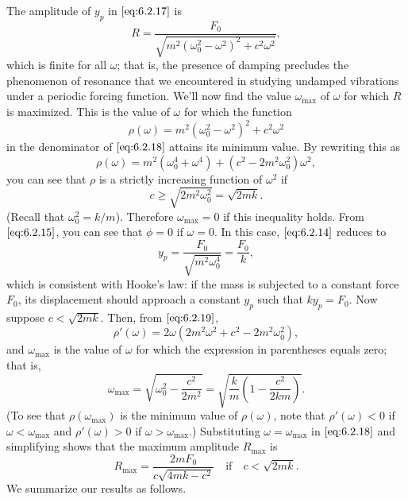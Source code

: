 \documentclass{ximera}
\begin{document}
The amplitude of $y_p$ in $\eqref{eq:6.2.17}$ is
\begin{equation}\label{eq:6.2.18}
R=\frac{F_0}{\sqrt{m^2(\omega^2_0-\omega^2)^2+c^2\omega^2}},
\end{equation}
which is finite for all $\omega$; that is, the presence of damping
precludes the phenomenon of resonance that we encountered in studying
undamped vibrations under a periodic forcing function. We'll now
find the value $\omega_{\max}$ of $\omega$ for which $R$ is maximized.
This is the value of $\omega$ for which the function
$$
\rho (\omega)=m^2(\omega^2_0-\omega^2)^2+c^2\omega^2
$$
in the denominator of  $\eqref{eq:6.2.18}$ attains its minimum value.  By
rewriting this as
\begin{equation}\label{eq:6.2.19}
\rho (\omega)=m^2(\omega^4_0+\omega^4)+
 (c^2-2m^2\omega^2_0)\omega^2,
\end{equation}
 you can see that $\rho$ is a strictly
increasing function of $\omega^2$ if
$$
c\geq\sqrt{2m^2\omega^2_0}=\sqrt{2mk}.
$$
(Recall that $\omega^2_0=k/m$). Therefore $\omega_{\max}=0$ if this
inequality holds. From $\eqref{eq:6.2.15}$, you can see that $\phi=0$ if
$\omega=0$. In this case, $\eqref{eq:6.2.14}$ reduces to
$$
y_p=\frac{F_0}{\sqrt{m^2\omega^4_0}}=\frac{F_0}{k},
$$
which is consistent with Hooke's law: if the mass is subjected to a
constant force $F_0$,  its displacement should approach a constant
$y_p$ such that $ky_p=F_0$. Now suppose   $c<\sqrt{2mk}$. Then,
from $\eqref{eq:6.2.19}$,
$$
\rho'(\omega)=2\omega(2m^2\omega^2+c^2-2m^2\omega^2_0),
$$
and $\omega_{\max}$ is the value of $\omega$ for which the
expression in parentheses equals zero; that is,
$$
\omega_{\max}=\sqrt{\omega^2_0-\frac{c^2}{2m^2}}
=\sqrt{\frac{k}{m}\left(1-\frac{c^2}{2km}\right)}.
$$
(To see that $\rho(\omega_{\max})$ is the minimum value of
$\rho(\omega)$, note that $\rho'(\omega)<0$ if $\omega
<\omega_{\max}$ and $\rho'(\omega)>0$ if $\omega>\omega_{\max}$.)
Substituting $\omega=\omega_{\max}$ in $\eqref{eq:6.2.18}$ and simplifying
shows that the maximum amplitude $R_{\max}$ is
$$
R_{\max}=\frac{2mF_0}{c\sqrt{4mk-c^2}}\quad \mbox{if}\quad c<
\sqrt{2mk}.
$$
We summarize our results  as follows.
 
\end{document}
